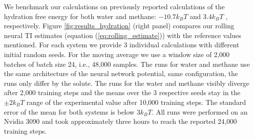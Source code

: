 \documentclass[%
onecolumn,
superscriptaddress,
nofootinbib,
amsmath,amssymb,
table
]{revtex4-2}
\begin{document}
We benchmark our calculations on previously reported calculations of the hydration free energy for both water and methane: $-10.7 k_BT$ \citep{jorgensen1989free} and $3.4k_BT$ \citep{mobley2009small}, respectively. Figure \ref{fig:results_hydration} (right panel) compares our rolling neural TI estimates (equation (\ref{eq:rolling_estimate})) with the reference values mentioned. For each system we provide 3 individual calculations with different initial random seeds. For the moving average we use a window size of 2,000 batches of batch size 24, i.e., 48,000 samples. The runs for water and methane use the same architecture of the neural network potential, same configuration, the runs only differ by the solute. The runs for the water and methane visibly diverge after 2,000 training steps and the means over the 3 respective seeds stay in the $\pm 2 k_BT$ range of the experimental value after 10,000 training steps. The standard error of the mean for both systems is below $3k_BT$.  All runs were performed on an Nvidia 3090 and took approximately three hours to reach the reported 24,000 training steps.
\end{document}
